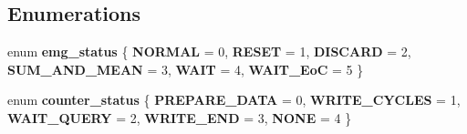\subsection*{Enumerations}
\begin{DoxyCompactItemize}
\item 
enum \textbf{ emg\+\_\+status} \{ \newline
\textbf{ N\+O\+R\+M\+AL} = 0, 
\textbf{ R\+E\+S\+ET} = 1, 
\textbf{ D\+I\+S\+C\+A\+RD} = 2, 
\textbf{ S\+U\+M\+\_\+\+A\+N\+D\+\_\+\+M\+E\+AN} = 3, 
\newline
\textbf{ W\+A\+IT} = 4, 
\textbf{ W\+A\+I\+T\+\_\+\+EoC} = 5
 \}
\item 
enum \textbf{ counter\+\_\+status} \{ \newline
\textbf{ P\+R\+E\+P\+A\+R\+E\+\_\+\+D\+A\+TA} = 0, 
\textbf{ W\+R\+I\+T\+E\+\_\+\+C\+Y\+C\+L\+ES} = 1, 
\textbf{ W\+A\+I\+T\+\_\+\+Q\+U\+E\+RY} = 2, 
\textbf{ W\+R\+I\+T\+E\+\_\+\+E\+ND} = 3, 
\newline
\textbf{ N\+O\+NE} = 4
 \}
\end{DoxyCompactItemize}
